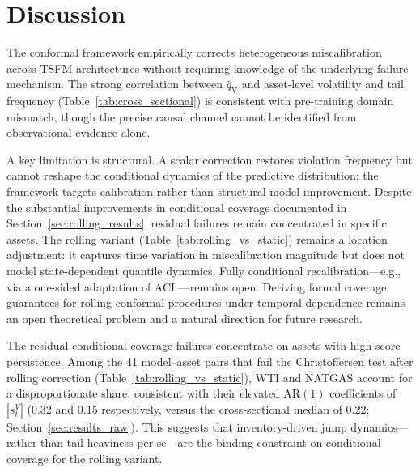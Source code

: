 \documentclass[preprint,11pt,authoryear]{elsarticle}
\newcommand{\1}{\boldsymbol{1}}
\newcommand{\qV}{\hat{q}_{\scriptscriptstyle\mathrm{V}}}
\begin{document}
	\section{Discussion}
	\label{sec:discuss}
	\label{sec:failure}

	The conformal framework empirically corrects heterogeneous miscalibration
	across TSFM architectures without requiring knowledge of the
	underlying failure mechanism. The strong correlation between
	$\qV$ and asset-level volatility and tail frequency
	(Table~\ref{tab:cross_sectional}) is consistent with
	pre-training domain mismatch, though the precise causal
	channel cannot be identified from observational evidence alone.
	
	A key limitation is structural. A scalar correction restores
	violation frequency but cannot reshape the conditional
	dynamics of the predictive distribution; the framework targets calibration rather than structural model improvement. Despite the substantial improvements in conditional coverage documented in Section~\ref{sec:rolling_results}, residual failures remain concentrated in specific assets. The rolling variant
	(Table~\ref{tab:rolling_vs_static}) remains a location
	adjustment: it captures time variation in miscalibration magnitude but does not model state-dependent quantile dynamics. Fully conditional recalibration---e.g., via a
	one-sided adaptation of ACI \citep{gibbs2021adaptive}---remains
	open.
	Deriving formal coverage guarantees for rolling conformal procedures under temporal dependence remains an open theoretical problem and a natural direction for future research.

	The residual conditional coverage failures concentrate on assets
	with high score persistence. Among the 41 model--asset pairs that
	fail the Christoffersen test after rolling correction
	(Table~\ref{tab:rolling_vs_static}), WTI and NATGAS account for
	a disproportionate share, consistent with their elevated
	$\mathrm{AR}(1)$ coefficients of $|s^V_t|$ (0.32 and 0.15
	respectively, versus the cross-sectional median of 0.22;
	Section~\ref{sec:results_raw}). This suggests that
	inventory-driven jump dynamics---rather than tail heaviness per
	se---are the binding constraint on conditional coverage for the
	rolling variant.
\end{document}
